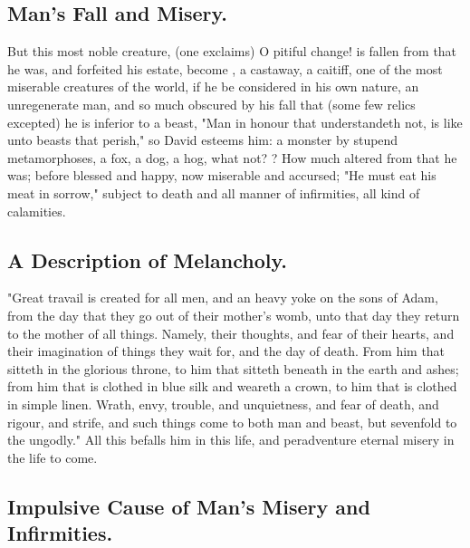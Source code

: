 \subsection{Man's Fall and Misery.}

But this most noble creature, 
(one exclaims) O pitiful change! is fallen from that he
was, and forfeited his estate, become , a castaway, a
caitiff, one of the most miserable creatures of the world, if he be considered
in his own nature, an unregenerate man, and so much obscured by his fall that
(some few relics excepted) he is inferior to a beast, "Man
in honour that understandeth not, is like unto beasts that perish," so David
esteems him: a monster by stupend metamorphoses, a fox, a
dog, a hog, what not? ? How much altered from that
he was; before blessed and happy, now miserable and accursed;
"He must eat his meat in sorrow," subject to death and all
manner of infirmities, all kind of calamities.

\subsection{A Description of Melancholy.}

"Great travail is created for all men, and an heavy yoke on the sons of Adam,
from the day that they go out of their mother's womb, unto that day they return
to the mother of all things. Namely, their thoughts, and fear of their hearts,
and their imagination of things they wait for, and the day of death. From him
that sitteth in the glorious throne, to him that sitteth beneath in the earth
and ashes; from him that is clothed in blue silk and weareth a crown, to him
that is clothed in simple linen. Wrath, envy, trouble, and unquietness, and
fear of death, and rigour, and strife, and such things come to both man and
beast, but sevenfold to the ungodly." All this befalls him
in this life, and peradventure eternal misery in the life to come.

\subsection[The Impulsive Cause]{Impulsive Cause of Man's Misery and Infirmities.}

